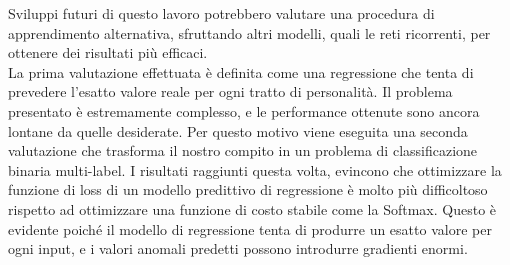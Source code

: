 Sviluppi futuri di questo lavoro potrebbero valutare una procedura di apprendimento alternativa, sfruttando altri modelli, quali le reti ricorrenti,  per ottenere dei risultati più efficaci.\\


La prima valutazione effettuata è definita come una regressione che tenta di prevedere l'esatto valore reale per ogni tratto di personalità.
Il problema presentato è estremamente complesso, e le performance ottenute sono ancora lontane da quelle desiderate.
Per questo motivo viene eseguita una seconda valutazione che trasforma il nostro compito in un problema di classificazione binaria multi-label.
I risultati raggiunti questa volta, evincono che ottimizzare la funzione di loss di un modello predittivo di regressione è molto più difficoltoso rispetto ad ottimizzare una funzione di costo stabile come la Softmax.
Questo è evidente poiché il modello di regressione tenta di produrre un esatto valore per ogni input, e i valori anomali predetti possono introdurre gradienti enormi.

 




